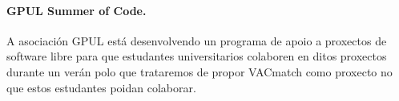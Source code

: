     \paragraph{GPUL Summer of Code.} A asociación GPUL está desenvolvendo un 
programa de apoio a proxectos de software libre para que estudantes 
universitarios colaboren en ditos proxectos durante un verán polo que trataremos 
de propor VACmatch como proxecto no que estos estudantes poidan colaborar.


